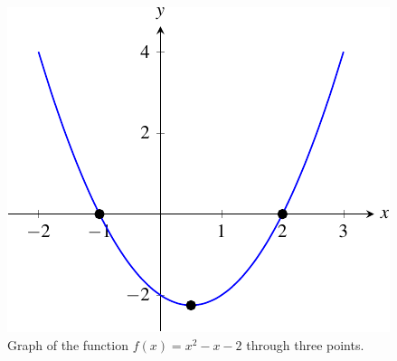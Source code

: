 \documentclass[a4paper,oneside,12pt]{article}
\begin{document}
\begin{figure}[!htbp]
\centering
\includegraphics[scale=1]{image/07/a1-bminus1-cminus2.pdf}
\caption{%
  Graph of the function $f(x) = x^2 - x - 2$ through three points.
}
\label{fig:a1_bminus1_cminus2}
\end{figure}
\end{document}
